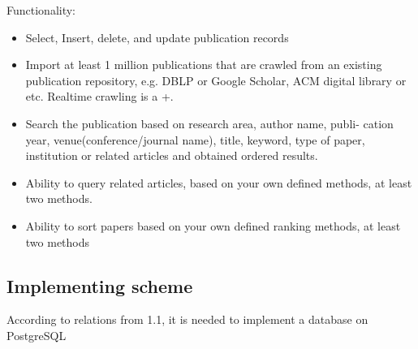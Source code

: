 \documentclass[12pt,a4paper]{article}
\begin{document}
Functionality:
\begin{itemize}
\item Select, Insert, delete, and update publication records
\item Import at least 1 million publications that are crawled from an existing publication repository, e.g. DBLP or Google Scholar, ACM digital
library or etc. Realtime crawling is a +.
\item Search the publication based on research area, author name, publi-
cation year, venue(conference/journal name), title, keyword, type of
paper, institution or related articles and obtained ordered results.
\item Ability to query related articles, based on your own defined methods,
\color{red}
at least two methods.
\color{black}
\item Ability to sort papers based on your own defined ranking methods, \color{red}at least two methods\color{black}
\end{itemize}
\subsection{Implementing scheme}
According to relations from 1.1, it is needed to implement a database on PostgreSQL
\end{document}
